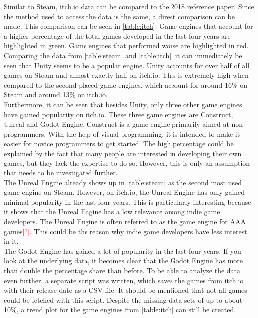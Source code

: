Similar to Steam, itch.io data can be compared to the 2018 reference paper.
Since the method used to access the data is the same, a direct comparison can be made.
This comparison can be seen in \autoref{table:itch}.
Game engines that account for a higher percentage of the total games developed in the last four years are highlighted in green.
Game engines that performed worse are highlighted in red.
Comparing the data from \autoref{table:steam} and \autoref{table:itch}, it can immediately be seen that Unity seems to be a popular engine.
Unity accounts for over half of all games on Steam and almost exactly half on itch.io.
This is extremely high when compared to the second-placed game engines, which account for around 16\% on Steam and around 13\% on itch.io.\\

Furthermore, it can be seen that besides Unity, only three other game engines have gained popularity on itch.io.
These three game engines are Construct, Unreal and Godot Engine.
Construct is a game engine primarily aimed at non-programmers.
With the help of visual programming, it is intended to make it easier for novice programmers to get started.
The high percentage could be explained by the fact that many people are interested in developing their own games, but they lack the expertise to do so.
However, this is only an assumption that needs to be investigated further. \\

The Unreal Engine already shows up in \autoref{table:steam} as the second most used game engine on Steam.
However, on itch.io, the Unreal Engine has only gained minimal popularity in the last four years.
This is particularly interesting because it shows that the Unreal Engine has a low relevance among indie game developers.
The Unreal Engine is often referred to as the game engine for AAA games\textcolor{red}{[?]}.
This could be the reason why indie game developers have less interest in it. \\

The Godot Engine has gained a lot of popularity in the last four years.
If you look at the underlying data, it becomes clear that the Godot Engine has more than double the percentage share than before.
To be able to analyze the data even further, a separate script was written, which saves the games from itch.io with their release date as a CSV file.
It should be mentioned that not all games could be fetched with this script.
Despite the missing data sets of up to about 10\%, a trend plot for the game engines from \autoref{table:itch} can still be created.\\


